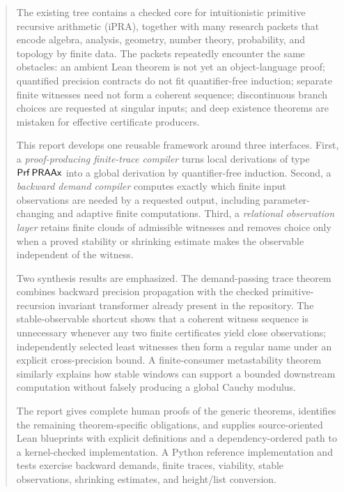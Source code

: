 \begin{abstract}
The existing  tree contains a checked core
for intuitionistic primitive recursive arithmetic (iPRA), together with many
research packets that encode algebra, analysis, geometry, number theory,
probability, and topology by finite data.  The packets repeatedly encounter the
same obstacles: an ambient Lean theorem is not yet an object-language proof;
quantified precision contracts do not fit quantifier-free induction; separate
finite witnesses need not form a coherent sequence; discontinuous branch
choices are requested at singular inputs; and deep existence theorems are
mistaken for effective certificate producers.

This report develops one reusable framework around three interfaces.  First, a
\emph{proof-producing finite-trace compiler} turns local derivations of type
\(\Prf\,\PRAAx\) into a global derivation by quantifier-free induction.
Second, a \emph{backward demand compiler} computes exactly which finite input
observations are needed by a requested output, including parameter-changing and
adaptive finite computations.  Third, a \emph{relational observation layer}
retains finite clouds of admissible witnesses and removes choice only when a
proved stability or shrinking estimate makes the observable independent of the
witness.

Two synthesis results are emphasized.  The demand-passing trace theorem
combines backward precision propagation with the checked primitive-recursion
invariant transformer already present in the repository.  The stable-observable
shortcut shows that a coherent witness sequence is unnecessary whenever any
two finite certificates yield close observations; independently selected
least witnesses then form a regular name under an explicit cross-precision
bound.  A finite-consumer metastability theorem similarly explains how stable
windows can support a bounded downstream computation without falsely producing
a global Cauchy modulus.

The report gives complete human proofs of the generic theorems, identifies the
remaining theorem-specific obligations, and supplies source-oriented Lean
blueprints with explicit definitions and a dependency-ordered path to a
kernel-checked implementation.  A Python reference implementation and tests
exercise backward demands, finite traces, viability, stable observations,
shrinking estimates, and height/list conversion.
\end{abstract}

